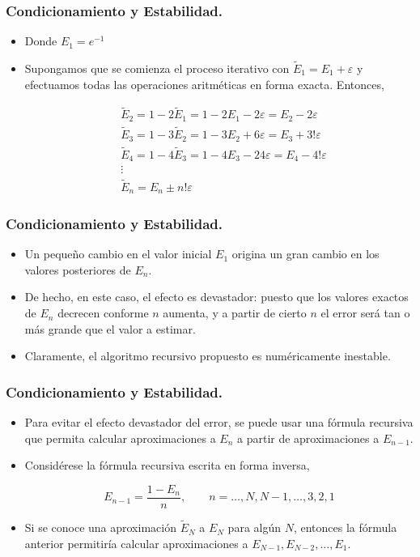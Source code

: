 \documentclass{beamer}
\begin{document}
\frame
{
  \frametitle{Condicionamiento y Estabilidad.}
  \begin{itemize}
    \item<1-> Donde $E_1=e^{-1}$
    \item<2-> Supongamos que se comienza el proceso iterativo con $\tilde E_1 = E_1 + \varepsilon$ y efectuamos todas las operaciones aritm\'eticas en forma exacta. Entonces,
\begin{block}{}
\begin{align}
 &\nonumber \tilde E_2 = 1 - 2\tilde E_1 = 1 - 2E_1 - 2\varepsilon = E_2 - 2\varepsilon\\ 
 &\nonumber \tilde E_3 = 1 - 3\tilde E_2 = 1 - 3E_2 + 6\varepsilon = E_3 + 3!\varepsilon\\
 &\nonumber \tilde E_4 = 1 - 4\tilde E_3 = 1 - 4E_3 - 24\varepsilon = E_4 - 4!\varepsilon\\
 &\nonumber \vdots\\
 &\nonumber \tilde E_n = E_n \pm n!\varepsilon
\end{align}
\end{block}
\end{itemize}
}
\frame
{
  \frametitle{Condicionamiento y Estabilidad.} 
  \begin{itemize} 
    \item<1-> Un peque\~no cambio en el valor inicial $E_1$ origina un gran cambio en los valores posteriores de $E_n$.
    \item<2-> De hecho, en este caso, el efecto es devastador: puesto que los valores exactos de $E_n$ decrecen conforme $n$ aumenta, y a partir de cierto $n$ el error ser\'a tan o m\'as grande que el valor a estimar. 
    \item<3-> Claramente, el algoritmo recursivo propuesto es num\'ericamente inestable.
  \end{itemize}
}
\frame
{
  \frametitle{Condicionamiento y Estabilidad.}
  \begin{itemize}
    \item<1-> Para evitar el efecto devastador del error, se puede usar una f\'ormula recursiva que permita calcular aproximaciones a $E_n$ a partir de aproximaciones a $E_{n-1}$.
    \item<2->Consid\'erese la f\'ormula recursiva escrita en forma inversa,
    \begin{block}{}
      $$
      E_{n-1} = \frac{1 - E_n}{n}, \qquad n=\ldots,N,N-1,\ldots,3,2,1
      $$
    \end{block}
    \item<3-> Si se conoce una aproximaci\'on $\tilde E_N$ a $E_N$ para alg\'un $N$, entonces la f\'ormula anterior permitir\'ia calcular aproximaciones a $E_{N-1}, E_{N-2},\ldots , E_1$.
  
  \end{itemize}
}
\end{document}
